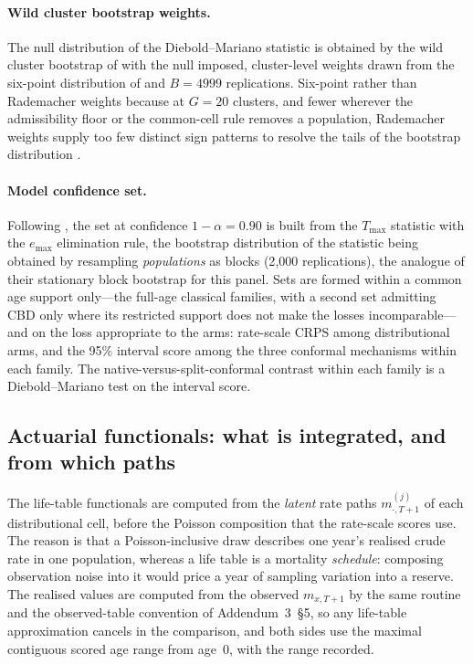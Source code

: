 \paragraph{Wild cluster bootstrap weights.} The null distribution of the
Diebold--Mariano statistic is obtained by the wild cluster bootstrap of
\citet{cameron2008bootstrap} with the null imposed, cluster-level weights
drawn from the six-point distribution of \citet{webb2023reworking} and
$B=4999$ replications. Six-point rather than Rademacher weights because at
$G=20$ clusters, and fewer wherever the admissibility floor or the common-cell
rule removes a population, Rademacher weights supply too few distinct sign
patterns to resolve the tails of the bootstrap distribution
\citep{mackinnon2017wild}.

\paragraph{Model confidence set.} Following \citet{hansen2011model}, the set at
confidence $1-\alpha = 0.90$ is built from the $T_{\max}$ statistic with the
$e_{\max}$ elimination rule, the bootstrap distribution of the statistic being
obtained by resampling \emph{populations} as blocks (2{,}000 replications),
the analogue of their stationary block bootstrap for this panel. Sets are
formed within a common age support only---the full-age classical families,
with a second set admitting CBD only where its restricted support does not
make the losses incomparable---and on the loss appropriate to the arms:
rate-scale CRPS among distributional arms, and the 95\% interval score among
the three conformal mechanisms within each family. The
native-versus-split-conformal contrast within each family is a
Diebold--Mariano test on the interval score.

\subsection{Actuarial functionals: what is integrated, and from which paths}
\label{supp:methods-actuarial}

The life-table functionals are computed from the \emph{latent} rate paths
$m^{(j)}_{\cdot,T+1}$ of each distributional cell, before the Poisson
composition that the rate-scale scores use. The reason is that a
Poisson-inclusive draw describes one year's realised crude rate in one
population, whereas a life table is a mortality \emph{schedule}: composing
observation noise into it would price a year of sampling variation into a
reserve. The realised values are computed from the observed $m_{x,T+1}$ by the
same routine and the observed-table convention of Addendum~3~\S5, so any
life-table approximation cancels in the comparison, and both sides use the
maximal contiguous scored age range from age~0, with the range recorded.

